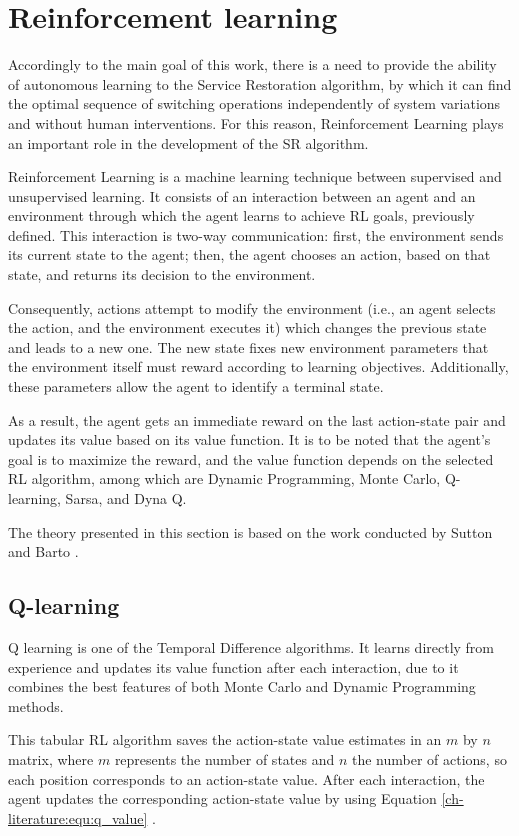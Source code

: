 \section{Reinforcement learning}
\label{ch-literature:sec:rl}

Accordingly to the main goal of this work, there is a need to provide the ability of autonomous 
learning to the Service Restoration algorithm, by which it can find the optimal sequence of 
switching operations independently of system variations and without human interventions.
For this reason, Reinforcement Learning plays an important role in  the development of the SR algorithm. 


Reinforcement Learning is a machine learning technique between supervised and unsupervised learning. 
It consists of an interaction between an agent and an environment through which the agent learns to achieve 
RL goals, previously defined. This interaction is two-way communication: first, the environment sends its 
current state to the agent; then, the agent chooses an action, based on that state, and returns its decision to the environment. 

Consequently, actions attempt to modify the environment (i.e., an agent selects the action, and the environment executes it) 
which changes the previous state and leads to a new one.  
The new state fixes new environment parameters that the environment itself must reward according to 
learning objectives. Additionally, these parameters allow the agent to identify a terminal state. 

As a result, the agent gets an immediate reward on the last action-state 
pair and updates its value based on its value function. It is to be noted that the agent's goal is to 
maximize the reward, and the value function depends on the selected RL algorithm, among which are Dynamic Programming, 
Monte Carlo, Q-learning, Sarsa, and Dyna Q.

The theory presented in this section is based on the work conducted by Sutton and Barto \cite{Sutton2014}. 

\subsection{Q-learning}
Q learning is one of the Temporal Difference algorithms. It learns directly from experience and 
updates its value function after each interaction, due to it combines the best features 
of both Monte Carlo and Dynamic Programming methods. 

This tabular RL algorithm saves the action-state value estimates in an $m$ by $n$ matrix, where $m$ 
represents the number of states and $n$ the number of actions, so each position corresponds to an 
action-state value.  After each interaction, the agent updates the corresponding action-state 
value by using Equation \ref{ch-literature:equ:q_value} \cite{Sutton2014}. 

